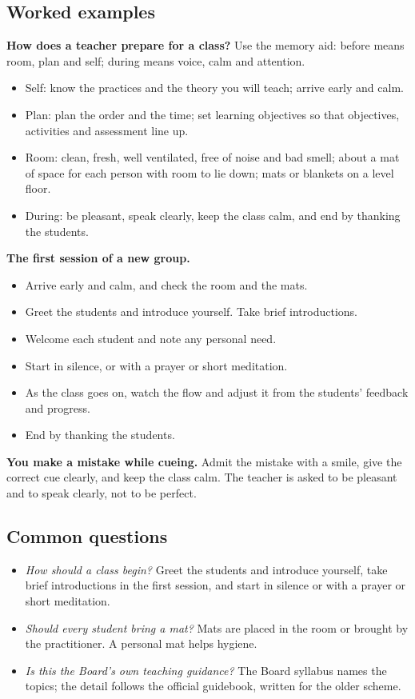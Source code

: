 \subsection*{Worked examples}

\textbf{How does a teacher prepare for a class?} Use the memory aid: before means room, plan and self; during means voice, calm and attention.
\begin{itemize}
\item Self: know the practices and the theory you will teach; arrive early and calm.
\item Plan: plan the order and the time; set learning objectives so that objectives, activities and assessment line up.
\item Room: clean, fresh, well ventilated, free of noise and bad smell; about a mat of space for each person with room to lie down; mats or blankets on a level floor.
\item During: be pleasant, speak clearly, keep the class calm, and end by thanking the students.
\end{itemize}

\textbf{The first session of a new group.}
\begin{itemize}
\item Arrive early and calm, and check the room and the mats.
\item Greet the students and introduce yourself. Take brief introductions.
\item Welcome each student and note any personal need.
\item Start in silence, or with a prayer or short meditation.
\item As the class goes on, watch the flow and adjust it from the students' feedback and progress.
\item End by thanking the students.
\end{itemize}

\textbf{You make a mistake while cueing.} Admit the mistake with a smile, give the correct cue clearly, and keep the class calm. The teacher is asked to be pleasant and to speak clearly, not to be perfect.

\subsection*{Common questions}

\begin{itemize}
\item \emph{How should a class begin?} Greet the students and introduce yourself, take brief introductions in the first session, and start in silence or with a prayer or short meditation.
\item \emph{Should every student bring a mat?} Mats are placed in the room or brought by the practitioner. A personal mat helps hygiene.
\item \emph{Is this the Board's own teaching guidance?} The Board syllabus names the topics; the detail follows the official guidebook, written for the older scheme.
\end{itemize}


